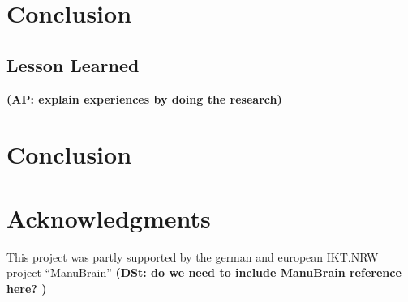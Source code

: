 \documentclass[5p,times,procedia]{elsarticle}
\newcommand{\AP}[1]{{\color{blue} {\bf (AP: #1)}}}
\newcommand{\DSt}[1]{{\color{orange} {\bf (DSt: #1)}}}
\begin{document}
\section{Conclusion}

\subsection{Lesson Learned} %

\AP{explain experiences by doing the research}

\section{Conclusion} %

\section*{Acknowledgments}
This project was partly supported by the german and european IKT.NRW
project "`ManuBrain"' 
\DSt{
do we need to include ManuBrain reference here?
}



\end{document}
